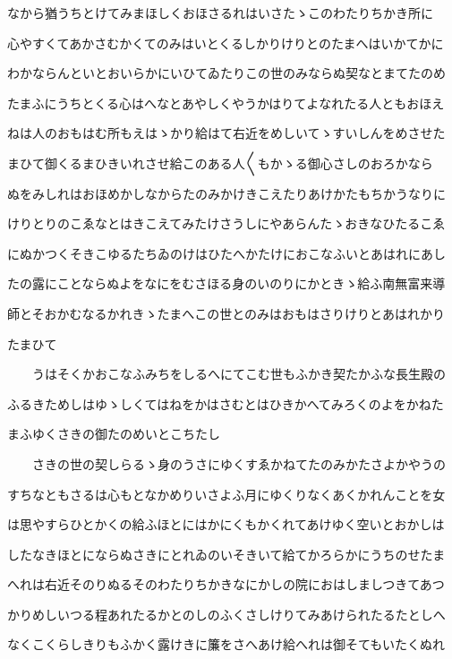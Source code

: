 \documentclass[a4paper,11pt,landscape]{ltjtarticle}
\begin{document}
なから猶うちとけてみまほしくおほさるれはいさたゝこのわたりちかき所に
\par\medskip
心やすくてあかさむかくてのみはいとくるしかりけりとのたまへはいかてかに
\par\medskip
わかならんといとおいらかにいひてゐたりこの世のみならぬ契なとまてたのめ
\par\medskip
たまふにうちとくる心はへなとあやしくやうかはりてよなれたる人ともおほえ
\par\medskip
ねは人のおもはむ所もえはゝかり給はて右近をめしいてゝすいしんをめさせた
\par\medskip
まひて御くるまひきいれさせ給このある人〱もかゝる御心さしのおろかなら
\par\medskip
ぬをみしれはおほめかしなからたのみかけきこえたりあけかたもちかうなりに
\par\medskip
けりとりのこゑなとはきこえてみたけさうしにやあらんたゝおきなひたるこゑ
\par\medskip
にぬかつくそきこゆるたちゐのけはひたへかたけにおこなふいとあはれにあし
\par\medskip
たの露にことならぬよをなにをむさほる身のいのりにかときゝ給ふ南無富来導
\par\medskip
師とそおかむなるかれきゝたまへこの世とのみはおもはさりけりとあはれかり
\par\medskip
たまひて
\par\medskip
　　うはそくかおこなふみちをしるへにてこむ世もふかき契たかふな長生殿の
\par\medskip
ふるきためしはゆゝしくてはねをかはさむとはひきかへてみろくのよをかねた
\par\medskip
まふゆくさきの御たのめいとこちたし
\par\medskip
　　さきの世の契しらるゝ身のうさにゆくすゑかねてたのみかたさよかやうの
\par\medskip
すちなともさるは心もとなかめりいさよふ月にゆくりなくあくかれんことを女
\par\medskip
は思やすらひとかくの給ふほとにはかにくもかくれてあけゆく空いとおかしは
\par\medskip
したなきほとにならぬさきにとれゐのいそきいて給てかろらかにうちのせたま
\par\medskip
へれは右近そのりぬるそのわたりちかきなにかしの院におはしましつきてあつ
\par\medskip
かりめしいつる程あれたるかとのしのふくさしけりてみあけられたるたとしへ
\par\medskip
なくこくらしきりもふかく露けきに簾をさへあけ給へれは御そてもいたくぬれ
\par\medskip
\end{document}
